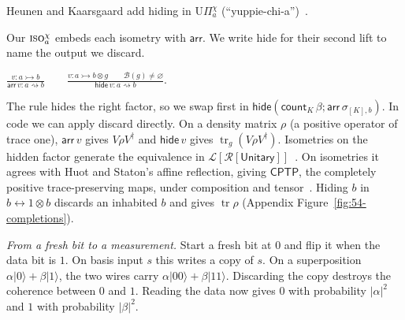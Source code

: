 \documentclass[acmsmall,screen,review,anonymous,nonacm]{acmart}
\newcommand{\storyinlineface}{\small\ttfamily}
\newcommand{\code}[1]{\textnormal{\storyinlineface #1}}
\newcommand{\tr}{\operatorname{tr}}
\newcommand{\ket}[1]{\lvert #1\rangle}
\numberwithin{equation}{section}
\begin{document}
Heunen and Kaarsgaard add hiding in $\mathrm{U}\Pi_a^\chi$
(“yuppie-chi-a”)~\cite[\S~3.4]{HeunenKaarsgaard22Effects}.
\par\smallskip\noindent\begin{minipage}[c]{.42\linewidth}
Our $\text{\textsc{iso}}_a^\chi$ embeds each isometry with $\mathsf{arr}$.
We write \textsf{hide} for their second \textsf{lift} to name the output we discard.
\end{minipage}\hfill\begin{minipage}[c]{.56\linewidth}\centering
$\displaystyle \frac{v:a\rightarrowtail b}{\mathsf{arr}\,v:a\rightsquigarrow b}
 \qquad
 \frac{v:a\rightarrowtail b\otimes g\qquad\mathcal B(g)\ne\varnothing}
      {\mathsf{hide}\,v:a\rightsquigarrow b}.$
\end{minipage}\par\smallskip
The rule hides the right factor, so we swap first in
$\mathsf{hide}(\mathsf{count}_K\,\beta;\mathsf{arr}\,\sigma_{[K],b})$. In code we can apply \code{discard} directly.
On a density matrix $\rho$ (a positive operator of trace one), $\mathsf{arr}\,v$ gives
$V\rho V^\dagger$ and $\mathsf{hide}\,v$ gives $\tr_g(V\rho V^\dagger)$. Isometries on the
hidden factor generate the equivalence in
$\mathcal L[\mathcal R[\mathsf{Unitary}]]$~\cite[Eq.~(3),
Thm.~22]{HeunenKaarsgaard22Effects}. On isometries it agrees with Huot and Staton's affine
reflection, giving $\mathsf{CPTP}$, the completely positive trace-preserving maps, under
composition and tensor~\cite[Cor.~7]{HuotStaton18}. Hiding $b$ in
$b\leftrightarrow1\otimes b$ discards an inhabited $b$ and gives $\tr\rho$ (Appendix
Figure~\ref{fig:54-completions}).

\par\medskip\noindent\begin{minipage}[c]{.60\linewidth}
\setlength{\parindent}{1em}\indent\textit{From a fresh bit to a measurement.}
Start a fresh bit at $0$ and flip it when the data bit is $1$.
On basis input $s$ this writes a copy of $s$. On a superposition
$\alpha\ket0+\beta\ket1$, the two wires carry
$\alpha\ket{00}+\beta\ket{11}$. Discarding the copy destroys the
coherence between $0$ and $1$. Reading the data now gives $0$ with
probability $|\alpha|^2$ and $1$ with probability $|\beta|^2$.
\end{minipage}\hfill
\begin{minipage}[c]{.38\linewidth}\centering
{}
\end{minipage}\par
\end{document}
